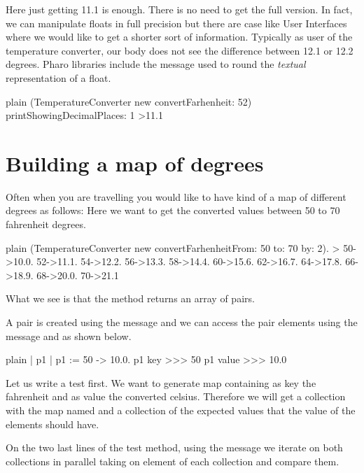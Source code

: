 \documentclass[10pt,twoside,english]{_support/latex/sbabook/sbabook}
\begin{document}
Here just getting 11.1 is enough. There is no need to get the full version. In fact, we can manipulate floats in full precision but there are case like User Interfaces where we would like to get a shorter sort of information. 
Typically as user of the temperature converter, our body does not see the difference between 12.1 or 12.2 degrees. 
Pharo libraries include the message  used to round the \textit{textual} representation of a float.

\begin{displaycode}{plain}
(TemperatureConverter new convertFarhenheit: 52) printShowingDecimalPlaces: 1
>11.1
\end{displaycode}
\section{Building a map of degrees}
Often when you are travelling you would like to have kind of a map of different degrees as follows: 
Here we want to get the converted values between 50 to 70 fahrenheit degrees.

\begin{displaycode}{plain}
(TemperatureConverter new convertFarhenheitFrom: 50 to: 70 by: 2).  
> { 50->10.0. 
	52->11.1. 
	54->12.2. 
	56->13.3. 
	58->14.4. 
	60->15.6. 
	62->16.7. 
	64->17.8. 
	66->18.9. 
	68->20.0. 
	70->21.1}
\end{displaycode}

What we see is that the method  returns an array of pairs.

A pair is created using the message \textcode{-\textgreater{}} and we can access the pair elements using the message  and  as shown below. 

\begin{displaycode}{plain}
| p1 |
p1 := 50 -> 10.0.
p1 key 
>>> 50
p1 value
>>> 10.0
\end{displaycode}

Let us write a test first. We want to generate map containing as key the fahrenheit and as value the converted celsius. Therefore we will get a collection with the map named  and a collection of the expected values
that the value of the elements should have. 

On the two last lines of the test method, using the message  we iterate on both collections in parallel
taking on element of each collection and compare them. 
\end{document}
